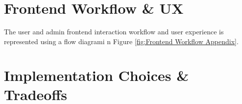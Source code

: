 \documentclass{article}
\begin{document}
\section{Frontend Workflow \& UX}
The user and admin frontend interaction workflow and user experience is represented using a flow diagrami n Figure \ref{fig:Frontend Workflow Appendix}.

\section{Implementation Choices \& Tradeoffs}
\end{document}
